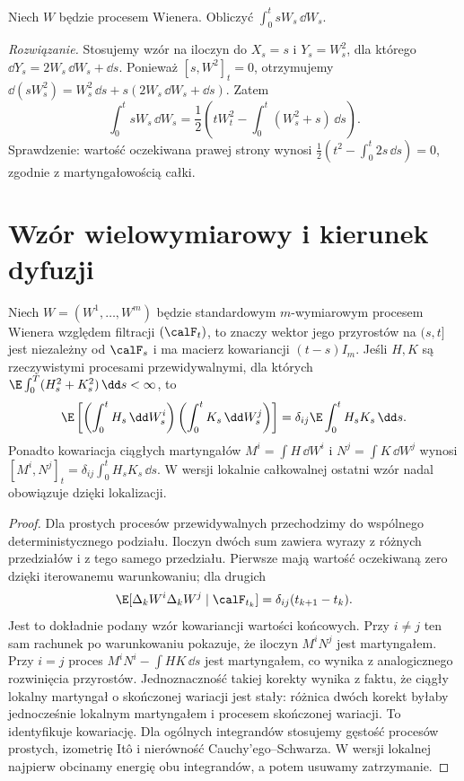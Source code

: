 \begin{zadanie}
Niech $W$ będzie procesem Wienera. Obliczyć
$\int_0^t sW_s\,\dd W_s$.

\emph{Rozwiązanie.} Stosujemy wzór na iloczyn do
$X_s=s$ i $Y_s=W_s^2$, dla którego
$\dd Y_s=2W_s\,\dd W_s+\dd s$.
Ponieważ $[s,W^2]_t=0$, otrzymujemy
$\dd(sW_s^2)=W_s^2\,\dd s+s(2W_s\,\dd W_s+\dd s)$.
Zatem
\[
\int_0^t sW_s\,\dd W_s
=\frac12\left(tW_t^2-\int_0^t(W_s^2+s)\,\dd s\right).
\]
Sprawdzenie: wartość oczekiwana prawej strony wynosi
$\frac12(t^2-\int_0^t2s\,\dd s)=0$, zgodnie z
martyngałowością całki.
\end{zadanie}

\section{Wzór wielowymiarowy i kierunek dyfuzji}
\begin{lemat}
\label{lem:multi-orthogonality}
Niech $W=(W^1,\ldots,W^m)$ będzie standardowym
$m$-wymiarowym procesem Wienera względem filtracji
$(\calF_t)$, to znaczy wektor jego przyrostów na
$(s,t]$ jest niezależny od $\calF_s$ i ma macierz
kowariancji $(t-s)I_m$. Jeśli $H,K$ są rzeczywistymi
procesami przewidywalnymi, dla których
$\E\int_0^T(H_s^2+K_s^2)\,\dd s<\infty$, to
\[
\E\left[
\left(\int_0^tH_s\,\dd W_s^i\right)
\left(\int_0^tK_s\,\dd W_s^j\right)\right]
=\delta_{ij}\E\int_0^tH_sK_s\,\dd s.
\]
Ponadto kowariacja ciągłych martyngałów
$M^i=\int H\,\dd W^i$ i
$N^j=\int K\,\dd W^j$ wynosi
$[M^i,N^j]_t=\delta_{ij}\int_0^tH_sK_s\,\dd s$.
W wersji lokalnie całkowalnej ostatni wzór nadal
obowiązuje dzięki lokalizacji.
\end{lemat}
\begin{proof}
Dla prostych procesów przewidywalnych przechodzimy do
wspólnego deterministycznego podziału. Iloczyn dwóch
sum zawiera wyrazy z różnych przedziałów i z tego
samego przedziału. Pierwsze mają wartość oczekiwaną
zero dzięki iterowanemu warunkowaniu; dla drugich
\[
\E[\Delta_kW^i\Delta_kW^j\mid\calF_{t_k}]
=\delta_{ij}(t_{k+1}-t_k).
\]
Jest to dokładnie podany wzór kowariancji wartości
końcowych. Przy $i\ne j$ ten sam rachunek po
warunkowaniu pokazuje, że iloczyn $M^iN^j$ jest
martyngałem. Przy $i=j$ proces
$M^iN^i-\int HK\,\dd s$ jest martyngałem,
co wynika z analogicznego rozwinięcia przyrostów.
Jednoznaczność takiej korekty wynika z faktu, że
ciągły lokalny martyngał o skończonej wariacji jest
stały: różnica dwóch korekt byłaby jednocześnie
lokalnym martyngałem i procesem skończonej wariacji.
To identyfikuje kowariację.
Dla ogólnych integrandów stosujemy gęstość procesów
prostych, izometrię Itô i nierówność Cauchy'ego--Schwarza.
W wersji lokalnej najpierw obcinamy energię obu
integrandów, a potem usuwamy zatrzymanie.
\end{proof}

